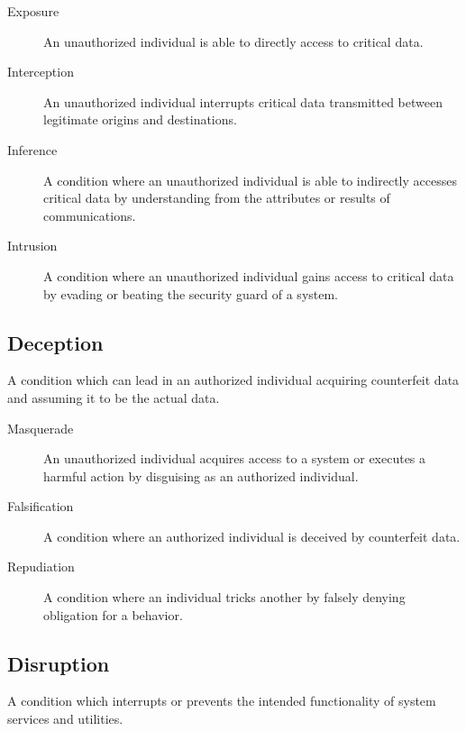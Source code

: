 \documentclass[../index.tex]{subfiles}
\begin{document}
\begin{description}

	\item[Exposure] An unauthorized individual is able to directly access to critical data.

	\item[Interception] An unauthorized individual interrupts critical data transmitted between
		legitimate origins and destinations.

	\item[Inference] A condition where an unauthorized individual is able to indirectly accesses
		critical data by understanding from the attributes or results of communications.

	\item[Intrusion] A condition where an unauthorized individual gains access to critical data by
		evading or beating the security guard of a system.

\end{description}

\subsection{Deception}

A condition which can lead in an authorized individual acquiring counterfeit data and assuming it to
be the actual data.

\begin{description}

	\item[Masquerade] An unauthorized individual acquires access to a system or executes a harmful
		action by disguising as an authorized individual.

	\item[Falsification] A condition where an authorized individual is deceived by counterfeit data.

	\item[Repudiation] A condition where an individual tricks another by falsely denying obligation
		for a behavior.

\end{description}

\subsection{Disruption}

A condition which interrupts or prevents the intended functionality of system services and
utilities.
\end{document}

